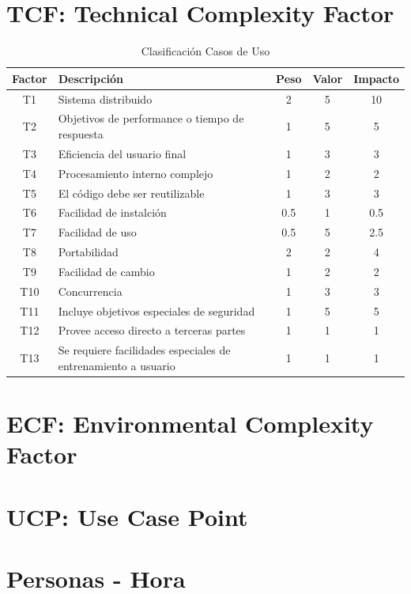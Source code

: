 \documentclass[12pt, a4paper, titlepage]{article}
\begin{document}
\section{TCF: Technical Complexity Factor}

\begin{table}[h]
	\begin{center}
		\begin{tabular}{|c|p{10cm}|c|c|c|}
			\hline
			Factor & Descripción & Peso & Valor & Impacto \\ \hline
			T1 & Sistema distribuido & 2 & 5 & 10 \\ \hline
			T2 & Objetivos de performance o tiempo de respuesta & 1 & 5 & 5 \\ \hline
			T3 & Eficiencia del usuario final & 1 & 3 & 3 \\ \hline
			T4 & Procesamiento interno complejo & 1 & 2 & 2 \\ \hline
			T5 & El código debe ser reutilizable & 1 & 3 & 3 \\ \hline
			T6 & Facilidad de instalción & 0.5 & 1 & 0.5 \\ \hline
			T7 & Facilidad de uso & 0.5 & 5 & 2.5 \\ \hline
			T8 & Portabilidad & 2 & 2 & 4 \\ \hline
			T9 & Facilidad de cambio & 1 & 2 & 2 \\ \hline
			T10 & Concurrencia & 1 & 3 & 3 \\ \hline
			T11 & Incluye objetivos especiales de seguridad & 1 & 5 & 5 \\ \hline
			T12 & Provee acceso directo a terceras partes & 1 & 1 & 1 \\ \hline
			T13 & Se requiere facilidades especiales de entrenamiento a usuario & 1 & 1 & 1 \\ \hline

	
	
	\end{tabular}
	\caption{Clasificación Casos de Uso}
	\end{center}
\end{table}

\section{ECF: Environmental Complexity Factor}

\section{UCP: Use Case Point}

\section{Personas - Hora}
\end{document}
